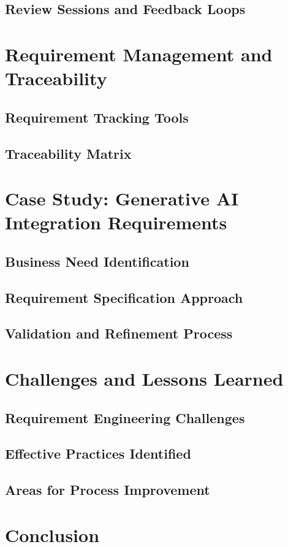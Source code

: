 \documentclass[a4paper, 11pt, oneside]{report}
\begin{document}
\subsection{Review Sessions and Feedback Loops}
\section{Requirement Management and Traceability}
\subsection{Requirement Tracking Tools}
\subsection{Traceability Matrix}
\section{Case Study: Generative AI Integration Requirements}
\subsection{Business Need Identification}
\subsection{Requirement Specification Approach}
\subsection{Validation and Refinement Process}
\section{Challenges and Lessons Learned}
\subsection{Requirement Engineering Challenges}
\subsection{Effective Practices Identified}
\subsection{Areas for Process Improvement}
\section{Conclusion}

\end{document}
